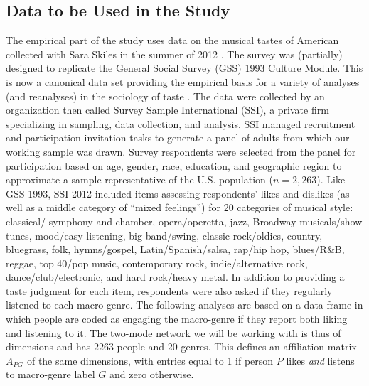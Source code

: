 \documentclass[a4paper,12pt]{extarticle}
\begin{document}
\subsection{Data to be Used in the Study}
The empirical part of the study uses data on the musical tastes of American collected with Sara Skiles in the summer of 2012 \citep{lizardo_skiles15, lizardo_skiles16}. The survey was (partially) designed to replicate the General Social Survey (GSS) 1993 Culture Module. This is now a canonical data set providing the empirical basis for a variety of analyses (and reanalyses) in the sociology of taste \citep[e.g.,][]{bryson96, goldberg2011mapping, schultz2010strength, han2003unraveling, tampubolon2008revisiting, okada2017structure}.  The data were collected by an organization then called Survey Sample International (SSI), a private firm specializing in sampling, data collection, and analysis. SSI managed recruitment and participation invitation tasks to generate a panel of adults from which our working sample was drawn. Survey respondents were selected from the panel for participation based on age, gender, race, education, and geographic region to approximate a sample representative of the U.S. population ($n = 2,263$). Like GSS 1993, SSI 2012 included items assessing respondents’ likes and dislikes (as well as a middle category of ``mixed feelings'') for 20 categories of musical style: classical/ symphony and chamber, opera/operetta, jazz, Broadway musicals/show tunes, mood/easy listening, big band/swing, classic rock/oldies, country, bluegrass, folk, hymns/gospel, Latin/Spanish/salsa, rap/hip hop, blues/R\&B, reggae, top 40/pop music, contemporary rock, indie/alternative rock, dance/club/electronic, and hard rock/heavy metal. In addition to providing a taste judgment for each item, respondents were also asked if they regularly listened to each macro-genre. The following analyses are based on a data frame in which people are coded as engaging the macro-genre if they report both liking and listening to it. The two-mode network we will be working with is thus of dimensions and has $2263$ people and $20$ genres. This defines an affiliation matrix $A_{PG}$ of the same dimensions, with entries equal to 1 if person $P$ likes \textit{and} listens to macro-genre label $G$ and zero otherwise. 
\end{document}

